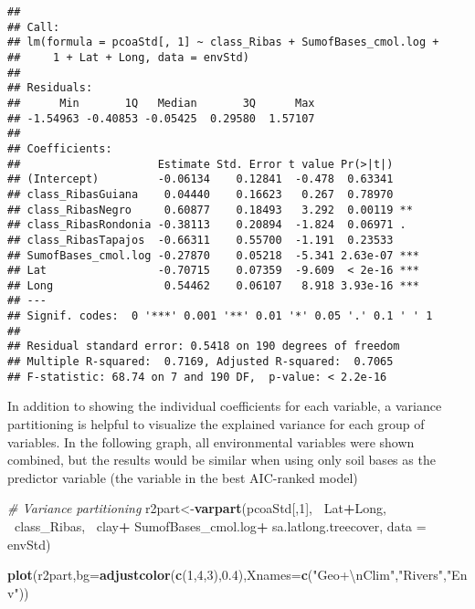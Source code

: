 \documentclass[]{article}
\newenvironment{Shaded}{\begin{snugshade}}{\end{snugshade}}
\newcommand{\CharTok}[1]{\textcolor[rgb]{0.31,0.60,0.02}{#1}}
\newcommand{\CommentTok}[1]{\textcolor[rgb]{0.56,0.35,0.01}{\textit{#1}}}
\newcommand{\DataTypeTok}[1]{\textcolor[rgb]{0.13,0.29,0.53}{#1}}
\newcommand{\DecValTok}[1]{\textcolor[rgb]{0.00,0.00,0.81}{#1}}
\newcommand{\FloatTok}[1]{\textcolor[rgb]{0.00,0.00,0.81}{#1}}
\newcommand{\KeywordTok}[1]{\textcolor[rgb]{0.13,0.29,0.53}{\textbf{#1}}}
\newcommand{\NormalTok}[1]{#1}
\newcommand{\OperatorTok}[1]{\textcolor[rgb]{0.81,0.36,0.00}{\textbf{#1}}}
\newcommand{\StringTok}[1]{\textcolor[rgb]{0.31,0.60,0.02}{#1}}
\begin{document}
\begin{verbatim}
## 
## Call:
## lm(formula = pcoaStd[, 1] ~ class_Ribas + SumofBases_cmol.log + 
##     1 + Lat + Long, data = envStd)
## 
## Residuals:
##      Min       1Q   Median       3Q      Max 
## -1.54963 -0.40853 -0.05425  0.29580  1.57107 
## 
## Coefficients:
##                     Estimate Std. Error t value Pr(>|t|)    
## (Intercept)         -0.06134    0.12841  -0.478  0.63341    
## class_RibasGuiana    0.04440    0.16623   0.267  0.78970    
## class_RibasNegro     0.60877    0.18493   3.292  0.00119 ** 
## class_RibasRondonia -0.38113    0.20894  -1.824  0.06971 .  
## class_RibasTapajos  -0.66311    0.55700  -1.191  0.23533    
## SumofBases_cmol.log -0.27870    0.05218  -5.341 2.63e-07 ***
## Lat                 -0.70715    0.07359  -9.609  < 2e-16 ***
## Long                 0.54462    0.06107   8.918 3.93e-16 ***
## ---
## Signif. codes:  0 '***' 0.001 '**' 0.01 '*' 0.05 '.' 0.1 ' ' 1
## 
## Residual standard error: 0.5418 on 190 degrees of freedom
## Multiple R-squared:  0.7169, Adjusted R-squared:  0.7065 
## F-statistic: 68.74 on 7 and 190 DF,  p-value: < 2.2e-16
\end{verbatim}

In addition to showing the individual coefficients for each variable, a
variance partitioning is helpful to visualize the explained variance for
each group of variables. In the following graph, all environmental
variables were shown combined, but the results would be similar when
using only soil bases as the predictor variable (the variable in the
best AIC-ranked model)

\begin{Shaded}
\begin{Highlighting}[]
\CommentTok{# Variance partitioning}
\NormalTok{r2part<-}\KeywordTok{varpart}\NormalTok{(pcoaStd[,}\DecValTok{1}\NormalTok{],}
                \OperatorTok{~}\NormalTok{Lat}\OperatorTok{+}\NormalTok{Long,}
                \OperatorTok{~}\NormalTok{class_Ribas,}
                \OperatorTok{~}\NormalTok{clay}\OperatorTok{+}
\StringTok{                  }\NormalTok{SumofBases_cmol.log}\OperatorTok{+}
\StringTok{                  }\NormalTok{sa.latlong.treecover,}
                \DataTypeTok{data =}\NormalTok{ envStd)}

\KeywordTok{plot}\NormalTok{(r2part,}\DataTypeTok{bg=}\KeywordTok{adjustcolor}\NormalTok{(}\KeywordTok{c}\NormalTok{(}\DecValTok{1}\NormalTok{,}\DecValTok{4}\NormalTok{,}\DecValTok{3}\NormalTok{),}\FloatTok{0.4}\NormalTok{),}\DataTypeTok{Xnames=}\KeywordTok{c}\NormalTok{(}\StringTok{"Geo+}\CharTok{\textbackslash{}n}\StringTok{Clim"}\NormalTok{,}\StringTok{"Rivers"}\NormalTok{,}\StringTok{"Env"}\NormalTok{))}
\end{Highlighting}
\end{Shaded}
\end{document}
